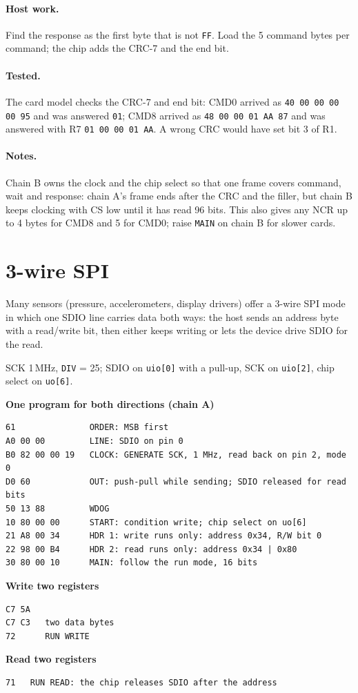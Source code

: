 \documentclass[11pt,a4paper]{article}
\newcommand{\sig}[1]{\texttt{#1}}
\newcommand{\progtitle}[1]{\par\smallskip\textbf{\small\color{accent}#1}\par\nopagebreak}
\newcommand{\facts}[1]{\par\noindent\colorbox{codebg}{\parbox{\dimexpr\linewidth-2\fboxsep}{\small #1}}\par}
\begin{document}
\paragraph{Host work.} Find the response as the first byte that is not \texttt{FF}. Load the 5 command bytes per command; the chip adds the CRC-7 and the end bit.

\paragraph{Tested.} The card model checks the CRC-7 and end bit: CMD0 arrived as \texttt{40 00 00 00 00 95} and was answered \texttt{01}; CMD8 arrived as \texttt{48 00 00 01 AA 87} and was answered with R7 \texttt{01 00 00 01 AA}. A wrong CRC would have set bit 3 of R1.
\paragraph{Notes.} Chain B owns the clock and the chip select so that one frame covers command, wait and response: chain A's frame ends after the CRC and the filler, but chain B keeps clocking with CS low until it has read 96 bits. This also gives any NCR up to 4 bytes for CMD8 and 5 for CMD0; raise \sig{MAIN} on chain B for slower cards.
\section{3-wire SPI}
Many sensors (pressure, accelerometers, display drivers) offer a 3-wire SPI mode in which one SDIO line carries data both ways: the host sends an address byte with a read/write bit, then either keeps writing or lets the device drive SDIO for the read.
\facts{SCK 1\,MHz, \sig{DIV} = 25; SDIO on \sig{uio[0]} with a pull-up, SCK on \sig{uio[2]}, chip select on \sig{uo[6]}.}
\progtitle{One program for both directions (chain A)}
\begin{lstlisting}
61               ORDER: MSB first
A0 00 00         LINE: SDIO on pin 0
B0 82 00 00 19   CLOCK: GENERATE SCK, 1 MHz, read back on pin 2, mode 0
D0 60            OUT: push-pull while sending; SDIO released for read bits
50 13 88         WDOG
10 80 00 00      START: condition write; chip select on uo[6]
21 A8 00 34      HDR 1: write runs only: address 0x34, R/W bit 0
22 98 00 B4      HDR 2: read runs only: address 0x34 | 0x80
30 80 00 10      MAIN: follow the run mode, 16 bits
\end{lstlisting}
\progtitle{Write two registers}
\begin{lstlisting}
C7 5A   
C7 C3   two data bytes
72      RUN WRITE
\end{lstlisting}
\progtitle{Read two registers}
\begin{lstlisting}
71   RUN READ: the chip releases SDIO after the address
\end{lstlisting}
\end{document}
